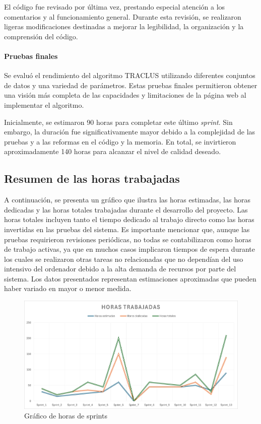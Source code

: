 El código fue revisado por última vez, prestando especial atención a los comentarios y al funcionamiento general. Durante esta revisión, se realizaron ligeras modificaciones destinadas a mejorar la legibilidad, la organización y la comprensión del código.

\paragraph{Pruebas finales}

Se evaluó el rendimiento del algoritmo TRACLUS utilizando diferentes conjuntos de datos y una variedad de parámetros. Estas pruebas finales permitieron obtener una visión más completa de las capacidades y limitaciones de la página web al implementar el algoritmo.

Inicialmente, se estimaron 90 horas para completar este último \textit{sprint}. Sin embargo, la duración fue significativamente mayor debido a la complejidad de las pruebas y a las reformas en el código y la memoria. En total, se invirtieron aproximadamente 140 horas para alcanzar el nivel de calidad deseado.

\subsection{Resumen de las horas trabajadas}

A continuación, se presenta un gráfico que ilustra las horas estimadas, las horas dedicadas y las horas totales trabajadas durante el desarrollo del proyecto. Las horas totales incluyen tanto el tiempo dedicado al trabajo directo como las horas invertidas en las pruebas del sistema. Es importante mencionar que, aunque las pruebas requirieron revisiones periódicas, no todas se contabilizaron como horas de trabajo activas, ya que en muchos casos implicaron tiempos de espera durante los cuales se realizaron otras tareas no relacionadas que no dependían del uso intensivo del ordenador debido a la alta demanda de recursos por parte del sistema. Los datos presentados representan estimaciones aproximadas que pueden haber variado en mayor o menor medida.

\begin{figure}[h]
    \centering
    \includegraphics[width=1\linewidth]{img/horassprints.png}
    \caption{Gráfico de horas de sprints}
\end{figure}
\FloatBarrier

